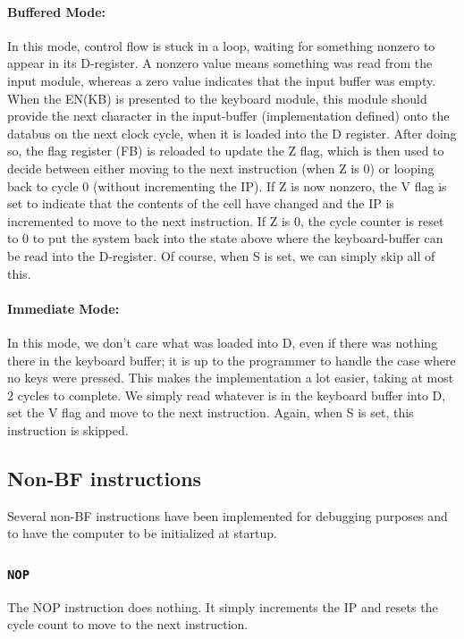 \paragraph{Buffered Mode:}
In this mode, control flow is stuck in a loop, waiting for something nonzero to appear in its D-register. A nonzero value means something was read from the input module, whereas a zero value indicates that the input buffer was empty. When the EN(KB) is presented to the keyboard module, this module should provide the next character in the input-buffer (implementation defined) onto the databus on the next clock cycle, when it is loaded into the D register. After doing so, the flag register (FB) is reloaded to update the Z flag, which is then used to decide between either moving to the next instruction (when Z is 0) or looping back to cycle 0 (without incrementing the IP). If Z is now nonzero, the V flag is set to indicate that the contents of the cell have changed and the IP is incremented to move to the next instruction. If Z is 0, the cycle counter is reset to 0 to put the system back into the state above where the keyboard-buffer can be read into the D-register. Of course, when S is set, we can simply skip all of this.

\paragraph{Immediate Mode:}
In this mode, we don't care what was loaded into D, even if there was nothing there in the keyboard buffer; it is up to the programmer to handle the case where no keys were pressed. This makes the implementation a lot easier, taking at most 2 cycles to complete. We simply read whatever is in the keyboard buffer into D, set the V flag and move to the next instruction. Again, when S is set, this instruction is skipped.
  
\subsection{Non-BF instructions} \label{seq:sequences:nonbf}
Several non-BF instructions have been implemented for debugging purposes and to have the computer to be initialized at startup.

\subsubsection{\texttt{NOP}}
The NOP instruction does nothing. It simply increments the IP and resets the cycle count to move to the next instruction.

